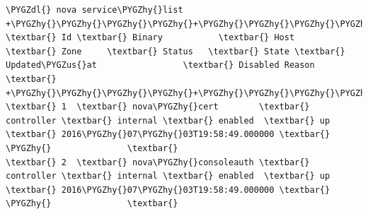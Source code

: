 \documentclass[letterpaper,10pt,english]{sphinxmanual}
\def\PYGZus{\char`\_}
\def\PYGZdl{\char`\$}
\def\PYGZhy{\char`\-}
\begin{document}
\begin{enumerate}
\begin{Verbatim}[commandchars=\\\{\}]
\PYGZdl{} nova service\PYGZhy{}list
+\PYGZhy{}\PYGZhy{}\PYGZhy{}\PYGZhy{}+\PYGZhy{}\PYGZhy{}\PYGZhy{}\PYGZhy{}\PYGZhy{}\PYGZhy{}\PYGZhy{}\PYGZhy{}\PYGZhy{}\PYGZhy{}\PYGZhy{}\PYGZhy{}\PYGZhy{}\PYGZhy{}\PYGZhy{}\PYGZhy{}\PYGZhy{}\PYGZhy{}+\PYGZhy{}\PYGZhy{}\PYGZhy{}\PYGZhy{}\PYGZhy{}\PYGZhy{}\PYGZhy{}\PYGZhy{}\PYGZhy{}\PYGZhy{}\PYGZhy{}\PYGZhy{}+\PYGZhy{}\PYGZhy{}\PYGZhy{}\PYGZhy{}\PYGZhy{}\PYGZhy{}\PYGZhy{}\PYGZhy{}\PYGZhy{}\PYGZhy{}+\PYGZhy{}\PYGZhy{}\PYGZhy{}\PYGZhy{}\PYGZhy{}\PYGZhy{}\PYGZhy{}\PYGZhy{}\PYGZhy{}\PYGZhy{}+\PYGZhy{}\PYGZhy{}\PYGZhy{}\PYGZhy{}\PYGZhy{}\PYGZhy{}\PYGZhy{}+\PYGZhy{}\PYGZhy{}\PYGZhy{}\PYGZhy{}\PYGZhy{}\PYGZhy{}\PYGZhy{}\PYGZhy{}\PYGZhy{}\PYGZhy{}\PYGZhy{}\PYGZhy{}\PYGZhy{}\PYGZhy{}\PYGZhy{}\PYGZhy{}\PYGZhy{}\PYGZhy{}\PYGZhy{}\PYGZhy{}\PYGZhy{}\PYGZhy{}\PYGZhy{}\PYGZhy{}\PYGZhy{}\PYGZhy{}\PYGZhy{}\PYGZhy{}+\PYGZhy{}\PYGZhy{}\PYGZhy{}\PYGZhy{}\PYGZhy{}\PYGZhy{}\PYGZhy{}\PYGZhy{}\PYGZhy{}\PYGZhy{}\PYGZhy{}\PYGZhy{}\PYGZhy{}\PYGZhy{}\PYGZhy{}\PYGZhy{}\PYGZhy{}+
\textbar{} Id \textbar{} Binary           \textbar{} Host       \textbar{} Zone     \textbar{} Status   \textbar{} State \textbar{} Updated\PYGZus{}at                 \textbar{} Disabled Reason \textbar{}
+\PYGZhy{}\PYGZhy{}\PYGZhy{}\PYGZhy{}+\PYGZhy{}\PYGZhy{}\PYGZhy{}\PYGZhy{}\PYGZhy{}\PYGZhy{}\PYGZhy{}\PYGZhy{}\PYGZhy{}\PYGZhy{}\PYGZhy{}\PYGZhy{}\PYGZhy{}\PYGZhy{}\PYGZhy{}\PYGZhy{}\PYGZhy{}\PYGZhy{}+\PYGZhy{}\PYGZhy{}\PYGZhy{}\PYGZhy{}\PYGZhy{}\PYGZhy{}\PYGZhy{}\PYGZhy{}\PYGZhy{}\PYGZhy{}\PYGZhy{}\PYGZhy{}+\PYGZhy{}\PYGZhy{}\PYGZhy{}\PYGZhy{}\PYGZhy{}\PYGZhy{}\PYGZhy{}\PYGZhy{}\PYGZhy{}\PYGZhy{}+\PYGZhy{}\PYGZhy{}\PYGZhy{}\PYGZhy{}\PYGZhy{}\PYGZhy{}\PYGZhy{}\PYGZhy{}\PYGZhy{}\PYGZhy{}+\PYGZhy{}\PYGZhy{}\PYGZhy{}\PYGZhy{}\PYGZhy{}\PYGZhy{}\PYGZhy{}+\PYGZhy{}\PYGZhy{}\PYGZhy{}\PYGZhy{}\PYGZhy{}\PYGZhy{}\PYGZhy{}\PYGZhy{}\PYGZhy{}\PYGZhy{}\PYGZhy{}\PYGZhy{}\PYGZhy{}\PYGZhy{}\PYGZhy{}\PYGZhy{}\PYGZhy{}\PYGZhy{}\PYGZhy{}\PYGZhy{}\PYGZhy{}\PYGZhy{}\PYGZhy{}\PYGZhy{}\PYGZhy{}\PYGZhy{}\PYGZhy{}\PYGZhy{}+\PYGZhy{}\PYGZhy{}\PYGZhy{}\PYGZhy{}\PYGZhy{}\PYGZhy{}\PYGZhy{}\PYGZhy{}\PYGZhy{}\PYGZhy{}\PYGZhy{}\PYGZhy{}\PYGZhy{}\PYGZhy{}\PYGZhy{}\PYGZhy{}\PYGZhy{}+
\textbar{} 1  \textbar{} nova\PYGZhy{}cert        \textbar{} controller \textbar{} internal \textbar{} enabled  \textbar{} up    \textbar{} 2016\PYGZhy{}07\PYGZhy{}03T19:58:49.000000 \textbar{} \PYGZhy{}               \textbar{}
\textbar{} 2  \textbar{} nova\PYGZhy{}consoleauth \textbar{} controller \textbar{} internal \textbar{} enabled  \textbar{} up    \textbar{} 2016\PYGZhy{}07\PYGZhy{}03T19:58:49.000000 \textbar{} \PYGZhy{}               \textbar{}

\end{Verbatim}
\end{enumerate}
\end{document}
